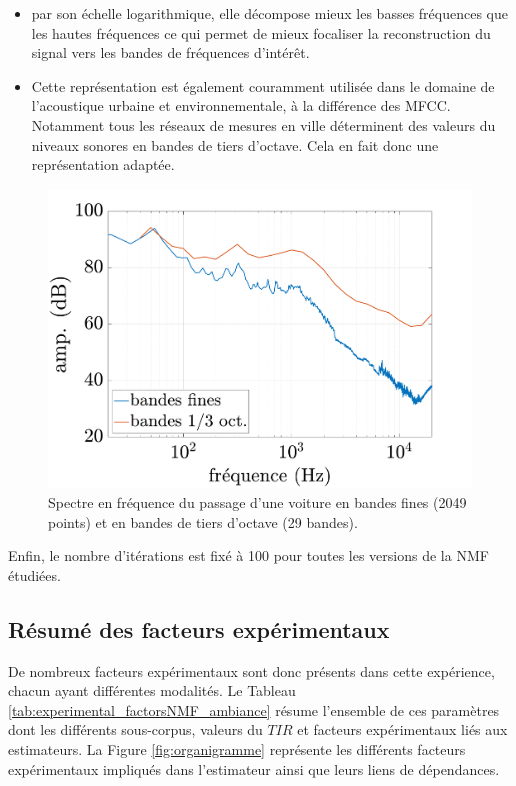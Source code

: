 \begin{itemize}
\item par son échelle logarithmique, elle décompose mieux les basses fréquences que les hautes fréquences ce qui permet de mieux focaliser la reconstruction du signal vers les bandes de fréquences d'intérêt.
\item Cette représentation est également couramment utilisée dans le domaine de l'acoustique urbaine et environnementale, à la différence des MFCC. Notamment tous les réseaux de mesures en ville déterminent des valeurs du niveaux sonores en bandes de tiers d'octave. Cela en fait donc une représentation adaptée.
\end{itemize}

\begin{figure}[h]
\centering
\includegraphics[width=0.5\linewidth]{./figures/NMF/bande_fine_tiers.pdf}
\caption{Spectre en fréquence du passage d'une voiture en bandes fines (2049 points) et en bandes de tiers d'octave (29 bandes).}
\label{fig:tiers_octaves}
\end{figure}

Enfin, le nombre d'itérations est fixé à 100 pour toutes les versions de la NMF étudiées.

\subsection{Résumé des facteurs expérimentaux}

De nombreux facteurs expérimentaux sont donc présents dans cette expérience, chacun ayant différentes modalités. Le Tableau \ref{tab:experimental_factorsNMF_ambiance} résume l'ensemble de ces paramètres dont les différents sous-corpus, valeurs du $TIR$ et facteurs expérimentaux liés aux estimateurs. La Figure \ref{fig:organigramme} représente les différents facteurs expérimentaux impliqués dans l'estimateur ainsi que leurs liens de dépendances.

